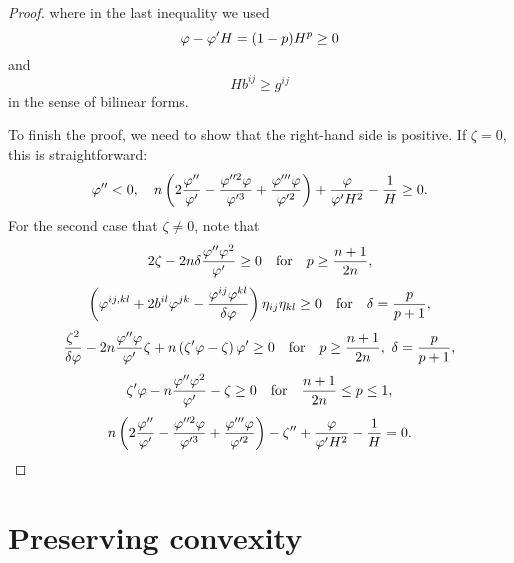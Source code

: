 \documentclass{amsart}
\begin{document}
\begin{proof}
where in the last inequality we used
$$\varphi-\varphi'H=(1-p)H^p\geq 0$$
and
$$Hb^{ij}\geq g^{ij}$$
in the sense of bilinear forms.

To finish the proof, we need to show that the right-hand side is positive. If $\zeta=0$, this is straightforward:
\[\varphi''<0,\quad n\left(2\frac{\varphi''}{\varphi'}-\frac{\varphi''^{2}\varphi}{\varphi'^{3}}+\frac{\varphi'''\varphi}{\varphi'^{2}}\right)+\frac{\varphi}{\varphi'H^2}-\frac{1}{H}\geq 0.\]
For the second case that $\zeta\neq 0$, note that
$$2\zeta-2n\delta\frac{\varphi''\varphi^2}{\varphi'}\geq 0\quad\mbox{for}\quad p\geq \frac{n+1}{2n},$$
$$\left(\varphi^{ij,kl}+2b^{il}\varphi^{jk}-\frac{\varphi^{ij}\varphi^{kl}}{\delta\varphi}\right)\eta_{ij}\eta_{kl}\geq0\quad\mbox{for}\quad\delta=\frac{p}{p+1},$$
$$\frac{\zeta^2}{\delta\varphi}-2n\frac{\varphi''\varphi}{\varphi'}\zeta+n\left(\zeta'\varphi-\zeta\right)\varphi'\geq 0\quad\mbox{for}\quad p\geq\frac{n+1}{2n},~\delta=\frac{p}{p+1},$$
$$\zeta'\varphi-n\frac{\varphi''\varphi^2}{\varphi'}-\zeta\geq 0\quad\mbox{for}\quad\frac{n+1}{2n}\leq p\leq 1,$$
$$n\left(2\frac{\varphi''}{\varphi'}-\frac{\varphi''^{2}\varphi}{\varphi'^{3}}+\frac{\varphi'''\varphi}{\varphi'^{2}}\right)-\zeta''+\frac{\varphi}{\varphi'H^2}-\frac{1}{H}=0.$$
\end{proof}

\section{Preserving convexity}
\label{sec:convexity} 
\end{document}
